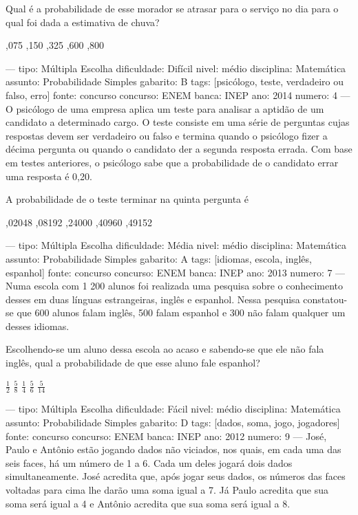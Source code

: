 Qual é a probabilidade de esse morador se atrasar para o serviço no dia para o qual foi dada a estimativa de chuva?
\begin{oneparchoices}
,075
,150
,325
,600
,800
\end{oneparchoices}

---
tipo: Múltipla Escolha
dificuldade: Difícil
nivel: médio
disciplina: Matemática
assunto: Probabilidade Simples
gabarito: B
tags: [psicólogo, teste, verdadeiro ou falso, erro]
fonte: concurso
concurso: ENEM
banca: INEP
ano: 2014
numero: 4
---
\question
O psicólogo de uma empresa aplica um teste para analisar a aptidão de um candidato a determinado cargo. O teste consiste em uma série de perguntas cujas respostas devem ser verdadeiro ou falso e termina quando o psicólogo fizer a décima pergunta ou quando o candidato der a segunda resposta errada. Com base em testes anteriores, o psicólogo sabe que a probabilidade de o candidato errar uma resposta é 0,20.

A probabilidade de o teste terminar na quinta pergunta é
\begin{oneparchoices}
,02048
,08192
,24000
,40960
,49152
\end{oneparchoices}

---
tipo: Múltipla Escolha
dificuldade: Média
nivel: médio
disciplina: Matemática
assunto: Probabilidade Simples
gabarito: A
tags: [idiomas, escola, inglês, espanhol]
fonte: concurso
concurso: ENEM
banca: INEP
ano: 2013
numero: 7
---
\question
Numa escola com 1 200 alunos foi realizada uma pesquisa sobre o conhecimento desses em duas línguas estrangeiras, inglês e espanhol. Nessa pesquisa constatou-se que 600 alunos falam inglês, 500 falam espanhol e 300 não falam qualquer um desses idiomas.

Escolhendo-se um aluno dessa escola ao acaso e sabendo-se que ele não fala inglês, qual a probabilidade de que esse aluno fale espanhol?
\begin{choices}
\correctchoice \( \frac{1}{2} \)
\choice \( \frac{5}{8} \)
\choice \( \frac{1}{4} \)
\choice \( \frac{5}{6} \)
\choice \( \frac{5}{14} \)
\end{choices}

---
tipo: Múltipla Escolha
dificuldade: Fácil
nivel: médio
disciplina: Matemática
assunto: Probabilidade Simples
gabarito: D
tags: [dados, soma, jogo, jogadores]
fonte: concurso
concurso: ENEM
banca: INEP
ano: 2012
numero: 9
---
\question
José, Paulo e Antônio estão jogando dados não viciados, nos quais, em cada uma das seis faces, há um número de 1 a 6. Cada um deles jogará dois dados simultaneamente. José acredita que, após jogar seus dados, os números das faces voltadas para cima lhe darão uma soma igual a 7. Já Paulo acredita que sua soma será igual a 4 e Antônio acredita que sua soma será igual a 8.

